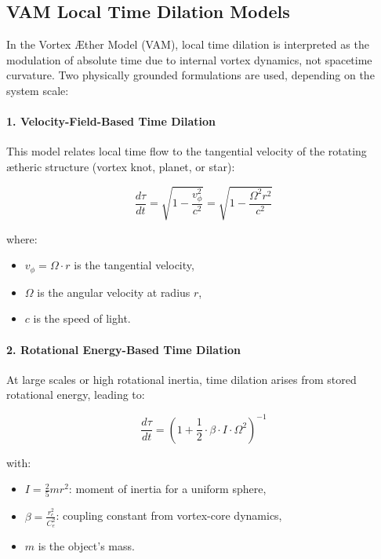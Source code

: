 \subsection*{VAM Local Time Dilation Models}

In the Vortex Æther Model (VAM), local time dilation is interpreted as the modulation of absolute time due to internal vortex dynamics, not spacetime curvature. Two physically grounded formulations are used, depending on the system scale:

\paragraph{1. Velocity-Field-Based Time Dilation}

This model relates local time flow to the tangential velocity of the rotating ætheric structure (vortex knot, planet, or star):

\begin{equation}
    \frac{d\tau}{dt} =
    \sqrt{1 - \frac{v_\phi^2}{c^2}} =
    \sqrt{1 - \frac{\Omega^2 r^2}{c^2}}
\end{equation}

where:
\begin{itemize}
    \item \( v_\phi = \Omega \cdot r \) is the tangential velocity,
    \item \( \Omega \) is the angular velocity at radius \( r \),
    \item \( c \) is the speed of light.
\end{itemize}

\paragraph{2. Rotational Energy-Based Time Dilation}

At large scales or high rotational inertia, time dilation arises from stored rotational energy, leading to:

\begin{equation}
    \frac{d\tau}{dt} =
    \left(1 + \frac{1}{2} \cdot \beta \cdot I \cdot \Omega^2 \right)^{-1}
\end{equation}

with:
\begin{itemize}
    \item \( I = \frac{2}{5} m r^2 \): moment of inertia for a uniform sphere,
    \item \( \beta = \frac{r_c^2}{C_e^2} \): coupling constant from vortex-core dynamics,
    \item \( m \) is the object's mass.
\end{itemize}

